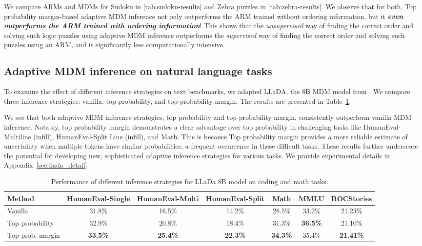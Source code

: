 \documentclass{article}
\theoremstyle{plain}
\theoremstyle{definition}
\theoremstyle{remark}
\begin{document}
We compare ARMs and MDMs for Sudoku in \cref{tab:sudoku-results} and Zebra puzzles in \cref{tab:zebra-results}. We observe that for both, Top probability margin-based adaptive MDM inference not only outperforms the ARM trained without ordering information, but it \emph{\textbf{even outperforms the ARM trained with ordering information}}! This shows that the \emph{unsupervised} way of finding the correct order and solving such logic puzzles using adaptive MDM inference outperforms the \emph{supervised} way of finding the correct order and solving such puzzles using an ARM, and is significantly less computationally intensive.

\subsection{Adaptive MDM inference on natural language tasks}

To examine the effect of different inference strategies on text benchmarks, we adapted LLaDA, the 8B MDM model from \cite{nie2025large}. We compare three inference strategies: vanilla, top probability, and top probability margin. The results are presented in Table~\ref{tab:sampler_performance}.

We see that both adaptive MDM inference strategies, top probability and top probability margin, consistently outperform vanilla MDM inference. Notably, top probability margin demonstrates a clear advantage over top probability in challenging tasks like HumanEval-Multiline (infill), HumanEval-Split Line (infill), and Math. This is because Top probability margin provides a more reliable estimate of uncertainty when multiple tokens have similar probabilities, a frequent occurrence in these difficult tasks. These results further underscore the potential for developing new, sophisticated adaptive inference strategies for various tasks. We provide experimental details in Appendix~\ref{sec:llada_detail}.

\begin{table}[!htbp]
    \centering
    \caption{Performance of different inference strategies for LLaDa 8B model on coding and math tasks.}
    \vspace{0.05in}
    \label{tab:sampler_performance}
    \begin{tabular}{lcccccc}
        \toprule
        \textbf{Method} & \textbf{HumanEval-Single} & \textbf{HumanEval-Multi} & \textbf{HumanEval-Split} & \textbf{Math} & \textbf{MMLU} & \textbf{ROCStories} \\
        \midrule
        Vanilla & 31.8\% & 16.5\% & 14.2\% & 28.5\% & 33.2\% & 21.23\% \\
        Top probability & 32.9\% & 20.8\% & 18.4\% & 31.3\% & \textbf{36.5\%} & 21.10\% \\
        Top prob. margin & \textbf{33.5\%} & \textbf{25.4\%} & \textbf{22.3\%} & \textbf{34.3\%} & 35.4\% & \textbf{21.41\%} \\
        \bottomrule
    \end{tabular}
\end{table}
\end{document}
